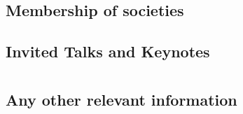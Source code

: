 \documentclass[11pt,a4paper]{moderncv}
\begin{document}
\subsection{Membership of societies}
\vspace{-1.75em}

\subsection{Invited Talks and Keynotes}
\vspace{-1.75em}

\section{}
\subsection{Any other relevant information}
\vspace{-1.75em}



















\newpage
{}


\end{document}
